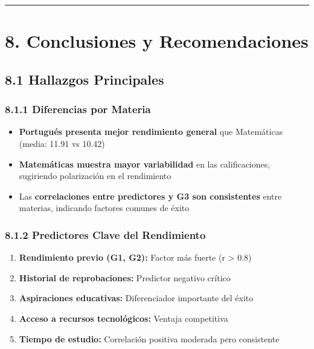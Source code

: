 \documentclass[
]{book}
\providecommand{\tightlist}{%
  \setlength{\itemsep}{0pt}\setlength{\parskip}{0pt}}
\begin{document}
\begin{center}\rule{0.5\linewidth}{0.5pt}\end{center}

\section{8. Conclusiones y Recomendaciones}\label{conclusiones-y-recomendaciones}

\subsection{8.1 Hallazgos Principales}\label{hallazgos-principales}

\subsubsection{8.1.1 Diferencias por Materia}\label{diferencias-por-materia}

\begin{itemize}
\tightlist
\item
  \textbf{Portugués presenta mejor rendimiento general} que Matemáticas (media: 11.91 vs 10.42)
\item
  \textbf{Matemáticas muestra mayor variabilidad} en las calificaciones, sugiriendo polarización en el rendimiento
\item
  Las \textbf{correlaciones entre predictores y G3 son consistentes} entre materias, indicando factores comunes de éxito
\end{itemize}

\subsubsection{8.1.2 Predictores Clave del Rendimiento}\label{predictores-clave-del-rendimiento}

\begin{enumerate}
\def\labelenumi{\arabic{enumi}.}
\tightlist
\item
  \textbf{Rendimiento previo (G1, G2):} Factor más fuerte (r \textgreater{} 0.8)
\item
  \textbf{Historial de reprobaciones:} Predictor negativo crítico
\item
  \textbf{Aspiraciones educativas:} Diferenciador importante del éxito
\item
  \textbf{Acceso a recursos tecnológicos:} Ventaja competitiva
\item
  \textbf{Tiempo de estudio:} Correlación positiva moderada pero consistente
\end{enumerate}
\end{document}
